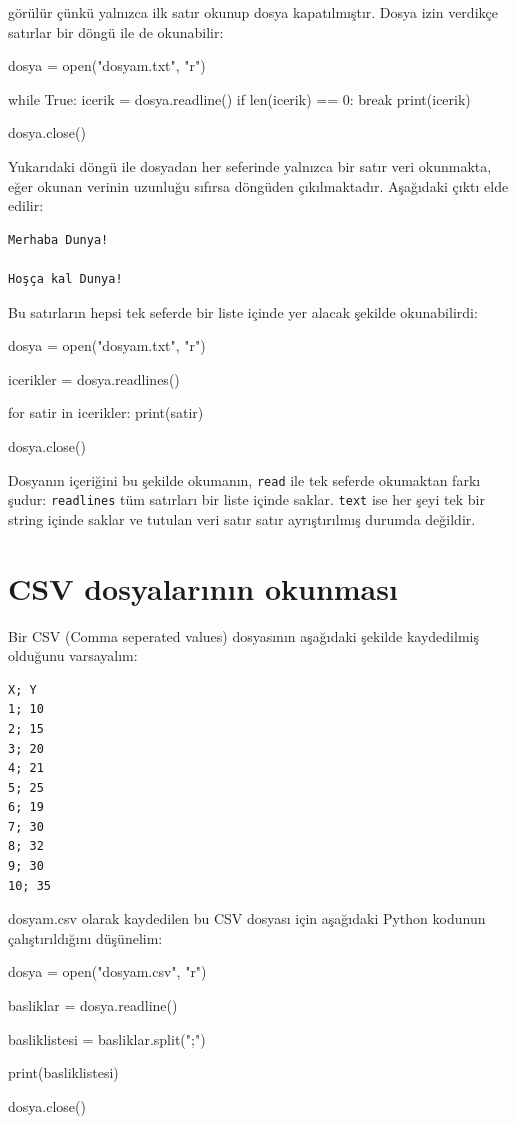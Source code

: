 \documentclass[12pt]{report}
\begin{document}
görülür çünkü yalnızca ilk satır okunup dosya kapatılmıştır. Dosya izin verdikçe satırlar bir döngü ile de okunabilir:


\begin{python}
dosya = open("dosyam.txt", "r")

while True:
	icerik = dosya.readline()
	if len(icerik) == 0:
		break
	print(icerik)

dosya.close()
\end{python}

Yukarıdaki döngü ile dosyadan her seferinde yalnızca bir satır veri okunmakta, eğer okunan verinin uzunluğu sıfırsa döngüden çıkılmaktadır. Aşağıdaki çıktı elde edilir:

\begin{verbatim}
Merhaba Dunya!

Hoşça kal Dunya!

\end{verbatim}



Bu satırların hepsi tek seferde bir liste içinde yer alacak şekilde okunabilirdi:


\begin{python}
dosya = open("dosyam.txt", "r")

icerikler = dosya.readlines()

for satir in icerikler:
	print(satir)

dosya.close()
\end{python}

Dosyanın içeriğini bu şekilde okumanın, \texttt{read} ile tek seferde okumaktan farkı şudur: \texttt{readlines} tüm satırları bir liste içinde saklar. \texttt{text} ise her şeyi tek bir string içinde saklar ve tutulan veri satır satır ayrıştırılmış durumda değildir. 


\section{CSV dosyalarının okunması}
Bir CSV (Comma seperated values) dosyasının aşağıdaki şekilde kaydedilmiş olduğunu varsayalım:

\begin{verbatim}
X; Y
1; 10
2; 15
3; 20
4; 21
5; 25
6; 19
7; 30
8; 32
9; 30
10; 35
\end{verbatim}

dosyam.csv olarak kaydedilen bu CSV dosyası için aşağıdaki Python kodunun çalıştırıldığını düşünelim:


\begin{python}
dosya = open("dosyam.csv", "r")

basliklar = dosya.readline()

basliklistesi = basliklar.split(";")

print(basliklistesi)

dosya.close()
\end{python}
\end{document}
